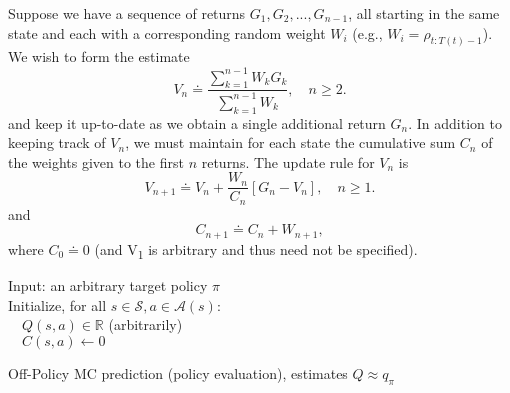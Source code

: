 \documentclass[11pt]{article}
\begin{document}
Suppose we have a sequence of returns \(G_1, G_2, {...}, G_{n-1}\), all starting
in the same state and each with a corresponding random weight \(W_i\) (e.g., \(W_i
= \rho_{t:T(t)-1}\)). We wish to form the estimate
\begin{equation}
V_n \doteq \frac{\sum_{k=1}^{n-1} W_k G_k}
{\sum_{k=1}^{n-1} W_k}, \quad n \geq 2.
\end{equation}
and keep it up-to-date as we obtain a single additional return \(G_n\). In
addition to keeping track of \(V_n\), we must maintain for each state the
cumulative sum \(C_n\) of the weights given to the first \(n\) returns. The update
rule for \(V_n\) is
\begin{equation}
V_{n+1} \doteq V_n + \frac{W_n}{C_n} [G_n - V_n], \quad n \geq 1.
\end{equation}
and
\begin{equation}
C_{n+1} \doteq C_n + W_{n+1},
\end{equation}
where \(C_0 \doteq 0\) (and V\textsubscript{1} is arbitrary and thus need not be specified).
\newline
\newline
\begin{algorithm}[H]
Input: an arbitrary target policy $\pi$ \\
Initialize, for all $s \in \mathcal{S}, a \in \mathcal{A}(s)$: \\
$\quad Q(s,a) \in \mathbb{R}$ (arbitrarily) \\
$\quad C(s,a) \leftarrow 0$ \\
\;
\;
\caption{Off-Policy MC prediction (policy evaluation), estimates $Q \approx q_{\pi}$}
\end{algorithm}
\end{document}
